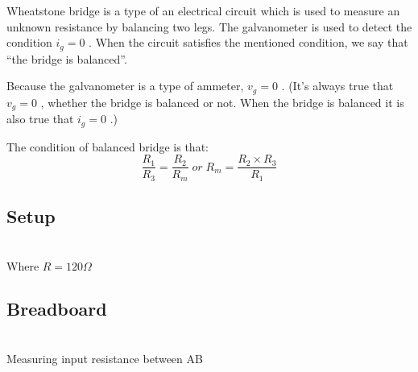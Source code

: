 \documentclass{article}
\begin{document}
Wheatstone bridge is a type of an electrical circuit which is used to measure an unknown resistance by balancing two legs. The galvanometer is used to detect the condition $i_g = 0$ . When the circuit satisfies the mentioned condition, we say that “the bridge is balanced”.

Because the galvanometer is a type of ammeter, $v_g = 0$ . (It’s always true that $v_g=0$ , whether the bridge is balanced or not. When the bridge is balanced it is also true that $i_g=0$ .)

The condition of balanced bridge is that:
\[ \frac{R_1}{R_3}=\frac{R_2}{R_m} \; or \; R_m= \frac{R_2 \times R_3}{R_1}\]

\subsection{Setup}
\begin{center}
     \\
    \vspace{5px}
    Where $R=120 \Omega$
\end{center}

\newpage

\subsection{Breadboard}
\begin{center}
     \\
    \vspace{5px}
    Measuring input resistance between AB
\end{center}
\end{document}
